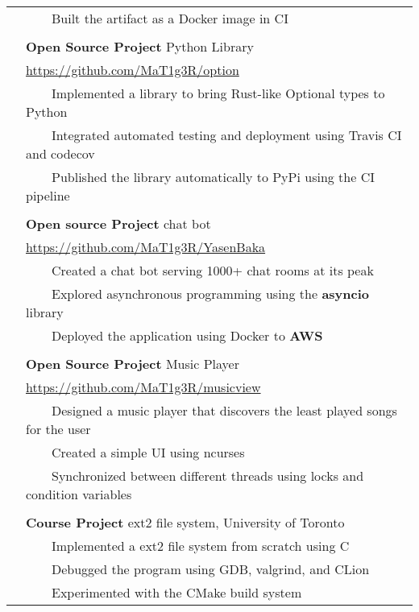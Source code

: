 \documentclass[letterpaper,12pt,oneside]{article}
\newcommand{\tabitem}{~~\llap{\textbullet}~~}
\newcommand{\smallurl}[1]{\small{\url{#1}}}
\begin{document}
\begin{longtable}{@{} l p{14cm}}
& \tabitem Built the artifact as a Docker image in CI \\
& \\
& \textbf{Open Source Project} Python Library \\
& \smallurl{https://github.com/MaT1g3R/option} \\
& \tabitem Implemented a library to bring Rust-like Optional types to Python \\
& \tabitem Integrated automated testing and deployment using Travis CI and codecov \\
& \tabitem Published the library automatically to PyPi using the CI pipeline \\
& \\
& \textbf{Open source Project} chat bot \\
& \smallurl{https://github.com/MaT1g3R/YasenBaka} \\
& \tabitem Created a chat bot serving 1000+ chat rooms at its peak \\
& \tabitem Explored asynchronous programming using the \textbf{asyncio} library \\
& \tabitem Deployed the application using Docker to \textbf{AWS} \\
& \\
& \textbf{Open Source Project} Music Player \\
& \smallurl{https://github.com/MaT1g3R/musicview} \\
& \tabitem Designed a music player that discovers the least played songs for the user \\
& \tabitem Created a simple UI using ncurses \\
& \tabitem Synchronized between different threads using locks and condition variables \\
& \\
& \textbf{Course Project} ext2 file system, University of Toronto \\
& \tabitem Implemented a ext2 file system from scratch using C \\
& \tabitem Debugged the program using GDB, valgrind, and CLion \\
& \tabitem Experimented with the CMake build system \\
\end{longtable}
\end{document}
